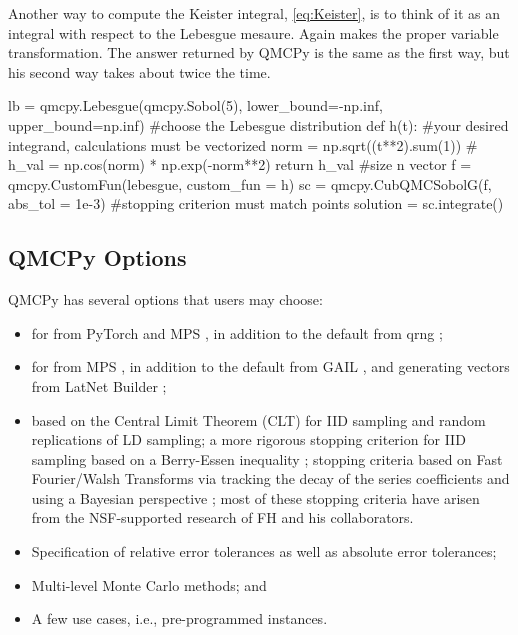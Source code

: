 \documentclass[11pt]{NSFamsart}
\begin{document}
Another way to compute the Keister integral, \eqref{eq:Keister}, is to think of it as an integral with respect to the Lebesgue mesaure.  Again  makes the proper variable transformation.  The answer returned by QMCPy is the same as the first way, but his second way takes about twice the time.

 \begin{pythoncode}
lb = qmcpy.Lebesgue(qmcpy.Sobol(5), lower_bound=-np.inf, upper_bound=np.inf)   #choose the Lebesgue distribution
def h(t):  #your desired integrand, calculations must be vectorized
 	norm = np.sqrt((t**2).sum(1))  #
 	h_val = np.cos(norm) * np.exp(-norm**2)
 	return h_val  #size n vector
 f = qmcpy.CustomFun(lebesgue, custom_fun = h)
 sc = qmcpy.CubQMCSobolG(f, abs_tol = 1e-3)  #stopping criterion must match  points
 solution = sc.integrate()
 \end{pythoncode}
 
 \subsection{QMCPy Options}
 QMCPy has several options that users may choose:
 \begin{itemize}
 	\item {} for  from PyTorch \cite{PyTorch} and MPS \cite{Nuy17a}, in addition to the default from qrng \cite{QRNG2020};
 	
 	\item {} for  from MPS \cite{Nuy17a}, in addition to the default from GAIL \cite{ChoEtal20a}, and generating vectors from LatNet Builder \cite{LatNet};
 	
 	\item {} based on the Central Limit Theorem (CLT) for IID sampling and random replications of LD sampling;  a more rigorous stopping criterion for IID sampling based on a Berry-Essen inequality \cite{HicEtal14a};  stopping criteria based on Fast Fourier/Walsh Transforms via tracking the decay of the series coefficients \cite{HicJim16a, JimHic16a} and using a Bayesian perspective \cite{RatHic19a}; most of these stopping criteria have arisen from the NSF-supported research of FH and his collaborators.
 	
 	\item Specification of relative error tolerances as well as absolute error tolerances;
 	
 	\item Multi-level Monte Carlo methods; and 
 	
 	\item A few use cases, i.e., pre-programmed  instances.
 \end{itemize}
 
\end{document}
